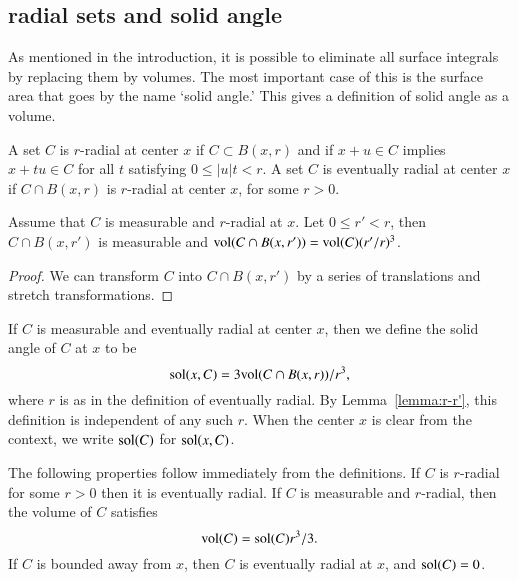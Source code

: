 \subsection{radial sets and solid angle}

As mentioned in the introduction, it is possible to eliminate all
surface integrals by replacing them by volumes.  The most
important case of this is the surface area that goes by the name
`solid angle.'  This gives a definition of solid angle as a
volume.


\begin{definition}
    A set $C$ is $r$-radial at center $x$ if  $C\subset B(x,r)$
    and if
        $x + u \in C$ implies
        $x + t u \in C$ for all $t$ satisfying $0\le |u| t < r$.
A set $C$ is eventually radial at center $x$ if $C\cap B(x,r)$ is
$r$-radial at center $x$, for some $r>0$.
\end{definition}

\begin{lemma}\label{lemma:r-r'}
Assume that $C$ is measurable and $r$-radial at $x$.  Let $0\le r'<r$,
then $C\cap B(x,r')$ is measurable and
${\operatorname{vol}}(C\cap B(x,r')) = {\operatorname{vol}}(C) (r'/r)^3$.
\end{lemma}

\begin{proof}  We can transform $C$ into $C\cap B(x,r')$ by
a series of translations and stretch transformations.
\end{proof}


\begin{definition}
If $C$ is measurable and eventually radial at center $x$, then we
define the solid angle of $C$ at $x$ to be
    $$
    {\operatorname{sol}}(x,C) = 3 {\operatorname{vol}}(C\cap B(x,r))/r^3,
    $$
where $r$ is as in the definition of eventually radial. 
By Lemma~\ref{lemma:r-r'}, this
definition is independent of any such $r$.  When the center $x$ is
clear from the context, we write ${\operatorname{sol}}(C)$ for
${\operatorname{sol}}(x,C)$.
\end{definition}



The following properties follow immediately from the definitions.
If $C$ is $r$-radial for some $r>0$ then it is eventually radial.
If $C$ is measurable and $r$-radial, then the volume of $C$
satisfies
    $$
    {\operatorname{vol}}(C) = {\operatorname{sol}}(C) r^3/3.
    $$
If $C$ is bounded away from $x$, then $C$ is eventually radial at
$x$, and ${\operatorname{sol}}(C) = 0$.








